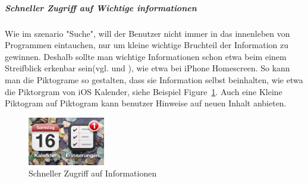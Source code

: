

\subparagraph{Schneller Zugriff auf Wichtige informationen} 
\label{subp:subparagraph_name}

Wie im szenario "Suche", will der Benutzer nicht immer in das innenleben von Programmen eintauchen, nur um kleine wichtige Bruchteil der Information zu gewinnen. Deshalb sollte man wichtige Informationen schon etwa beim einem Streifblick erkenbar sein(vgl. \cite[Seite 54]{mobileFrontier} und \cite{Neil:2012uf}),  wie etwa bei iPhone Homescreen. So kann man die Piktograme so gestalten, dass sie Information selbst beinhalten, wie etwa die Piktorgram von iOS Kalender, siehe Beispiel Figure~\ref{fig:iconIos}. Auch eine Kleine Piktogram auf Piktogram kann benutzer Hinweise auf neuen Inhalt anbieten.

\begin{figure}
	\begin{center}
	
	\includegraphics[width=0.3\textwidth]{img/iconIos.png}
	\caption{Schneller Zugriff auf Informationen}\label{fig:iconIos}
\end{center}
\end{figure}


